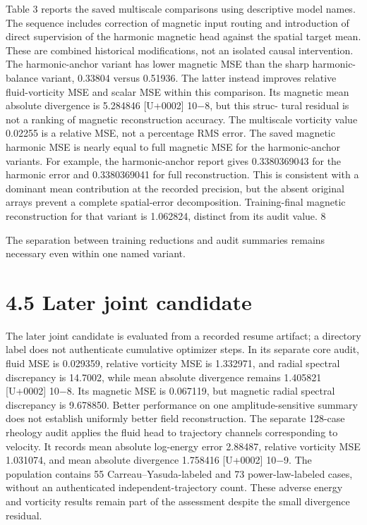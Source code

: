 \documentclass[11pt]{article}
\begin{document}
Table 3 reports the saved multiscale comparisons using descriptive model names. The sequence
includes correction of magnetic input routing and introduction of direct supervision of the harmonic
magnetic head against the spatial target mean. These are combined historical modifications, not
an isolated causal intervention.
The harmonic-anchor variant has lower magnetic MSE than the sharp harmonic-balance variant,
0.33804 versus 0.51936. The latter instead improves relative fluid-vorticity MSE and scalar MSE
within this comparison. Its magnetic mean absolute divergence is 5.284846 [U+0002] 10\ensuremath{-}8, but this struc-
tural residual is not a ranking of magnetic reconstruction accuracy. The multiscale vorticity value
0.02255 is a relative MSE, not a percentage RMS error.
The saved magnetic harmonic MSE is nearly equal to full magnetic MSE for the harmonic-anchor
variants. For example, the harmonic-anchor report gives 0.3380369043 for the harmonic error and
0.3380369041 for full reconstruction. This is consistent with a dominant mean contribution at the
recorded precision, but the absent original arrays prevent a complete spatial-error decomposition.
Training-final magnetic reconstruction for that variant is 1.062824, distinct from its audit value.
8

The separation between training reductions and audit summaries remains necessary even within
one named variant.

\section*{4.5 Later joint candidate}

The later joint candidate is evaluated from a recorded resume artifact; a directory label does
not authenticate cumulative optimizer steps. In its separate core audit, fluid MSE is 0.029359,
relative vorticity MSE is 1.332971, and radial spectral discrepancy is 14.7002, while mean absolute
divergence remains 1.405821 [U+0002] 10\ensuremath{-}8. Its magnetic MSE is 0.067119, but magnetic radial spectral
discrepancy is 9.678850. Better performance on one amplitude-sensitive summary does not establish
uniformly better field reconstruction.
The separate 128-case rheology audit applies the fluid head to trajectory channels corresponding
to velocity. It records mean absolute log-energy error 2.88487, relative vorticity MSE 1.031074, and
mean absolute divergence 1.758416 [U+0002] 10\ensuremath{-}9. The population contains 55 Carreau–Yasuda-labeled
and 73 power-law-labeled cases, without an authenticated independent-trajectory count. These
adverse energy and vorticity results remain part of the assessment despite the small divergence
residual.
\end{document}
